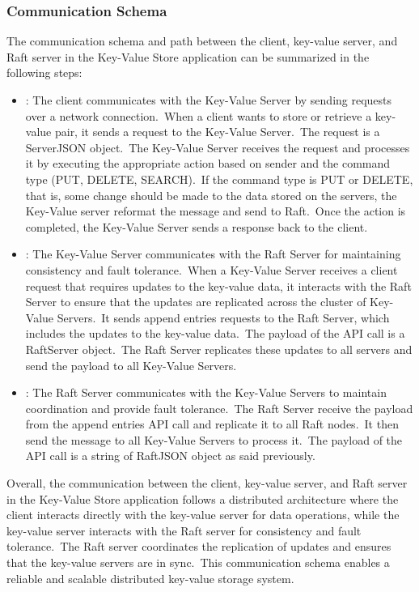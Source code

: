 \documentclass{article}
\begin{document}
\subsubsection{Communication Schema}
The communication schema and path between the client, key-value server, and Raft server in the
Key-Value Store application can be summarized in the following steps:
\begin{itemize}
    \item {}: The client communicates with the Key-Value Server
    by sending requests over a network connection.\ When a client wants to store or retrieve
    a key-value pair, it sends a request to the Key-Value Server.\ The request is a ServerJSON
    object.\ The Key-Value Server receives the request and processes it by executing the
    appropriate action based on sender and the command type (PUT, DELETE, SEARCH).\ If the
    command type is PUT or DELETE, that is, some change should be made to the data stored on
    the servers, the Key-Value server reformat the message and send to Raft.\ Once the
    action is completed, the Key-Value Server sends a response back to the client.
    \item {}: The Key-Value Server communicates with the
    Raft Server for maintaining consistency and fault tolerance.\ When a Key-Value Server
    receives a client request that requires updates to the key-value data, it interacts with
    the Raft Server to ensure that the updates are replicated across the cluster of Key-Value
    Servers.\ It sends append entries requests to the Raft Server, which includes the updates
    to the key-value data.\ The payload of the API call is a RaftServer object.\ The Raft
    Server replicates these updates to all servers and send the payload to all Key-Value
    Servers.
    \item {}: The Raft Server communicates with the Key-Value
    Servers to maintain coordination and provide fault tolerance.\ The Raft Server receive the
    payload from the append entries API call and replicate it to all Raft nodes.\ It then send
    the message to all Key-Value Servers to process it.\ The payload of the API call is a string
    of RaftJSON object as said previously.
\end{itemize}

Overall, the communication between the client, key-value server, and Raft server in the Key-Value
Store application follows a distributed architecture where the client interacts directly with the
key-value server for data operations, while the key-value server interacts with the Raft server
for consistency and fault tolerance.\ The Raft server coordinates the replication of updates and
ensures that the key-value servers are in sync.\ This communication schema enables a reliable and
scalable distributed key-value storage system.
\end{document}
